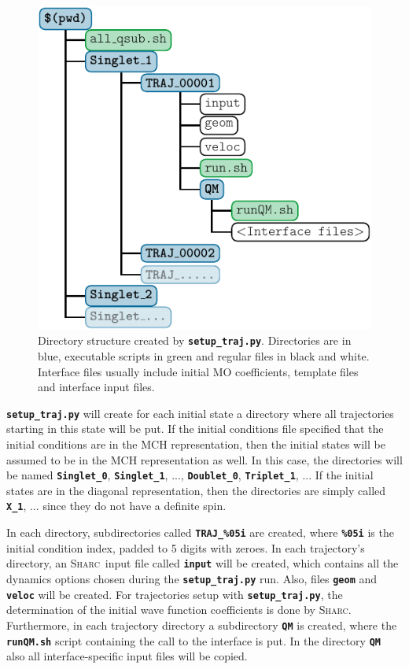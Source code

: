 \documentclass[a4paper,10pt,DIV=15,openany]{scrbook}
\newcommand{\sharc}{\textsc{Sharc}}
\newcommand{\ttt}[1]{\textbf{\texttt{#1}}}
\begin{document}
\begin{figure}
  \centering
  \includegraphics[scale=1]{img/dirs_traj/dirs_traj.pdf}
  \caption[Directory structure created by \ttt{setup\_traj.py}.]{Directory structure created by \ttt{setup\_traj.py}. Directories are in blue, executable scripts in green and regular files in black and white. Interface files usually include initial MO coefficients, template files and interface input files.}
  \label{fig:dirs_traj}
\end{figure}

\ttt{setup\_traj.py} will create for each initial state a directory where all trajectories starting in this state will be put. If the initial conditions file specified that the initial conditions are in the MCH representation, then the initial states will be assumed to be in the MCH representation as well. In this case, the directories will be named \ttt{Singlet\_0}, \ttt{Singlet\_1}, ..., \ttt{Doublet\_0}, \ttt{Triplet\_1}, ... If the initial states are in the diagonal representation, then the directories are simply called \ttt{X\_1}, ... since they do not have a definite spin.

In each directory, subdirectories called \ttt{TRAJ\_\%05i} are created, where \ttt{\%05i} is the initial condition index, padded to 5 digits with zeroes. In each trajectory's directory, an \sharc\ input file called \ttt{input} will be created, which contains all the dynamics options chosen during the \ttt{setup\_traj.py} run. Also, files \ttt{geom} and \ttt{veloc} will be created. For trajectories setup with \ttt{setup\_traj.py}, the determination of the initial wave function coefficients is done by \sharc.
Furthermore, in each trajectory directory a subdirectory \ttt{QM} is created, where the \ttt{runQM.sh} script containing the call to the interface is put. In the directory \ttt{QM} also all interface-specific input files will be copied.
\end{document}
